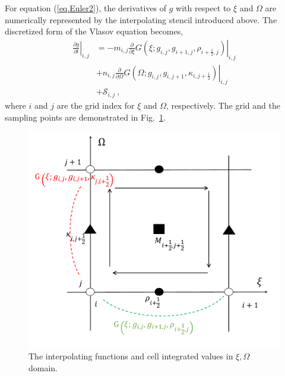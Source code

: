 For equation (\ref{eq.Euler2}), the derivatives of $g$ with respect to $\xi$ and $\Omega$ are numerically represented by the interpolating stencil introduced above. 
The discretized form of the Vlasov equation becomes,
\begin{equation}\label{eq.disV}
    \begin{aligned}
    \left.\frac{\partial g}{\partial t}\right|_{i,j}   & =  - m_{i,j} \left.\frac{\partial}{\partial \xi} G\left(\xi;g_{i,j},g_{i+1,j},\rho_{i+\frac{1}{2},j}\right)\right|_{i,j} 
    \\
    & + n_{i,j}  \left.\frac{\partial}{\partial \Omega}G\left(\Omega;g_{i,j},g_{i,j+1},\kappa_{i,j+\frac{1}{2}}\right)\right|_{i,j}
    \\
    & +  \mathcal{S}_{i,j}~,
    \end{aligned}
\end{equation}
where $i$ and $j$ are the grid index for $\xi$ and $\Omega$, respectively. 
The grid and the sampling points are demonstrated in Fig.~\ref{fig.grids}.
\begin{figure}[htbp]
    \centering
    \includegraphics[scale=0.3]{cpc_img/IDO.pdf}
    \caption{The interpolating functions and cell integrated values in $\xi,\Omega$ domain.}
    \label{fig.grids}
\end{figure}
